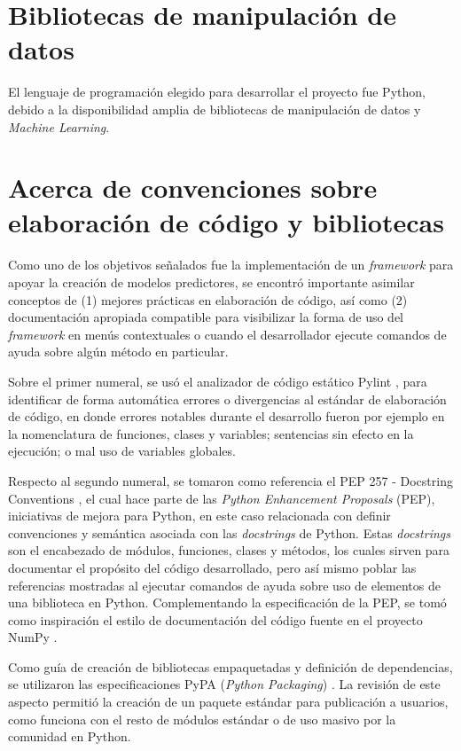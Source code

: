 \section{Bibliotecas de manipulación de datos}

El lenguaje de programación elegido para desarrollar el proyecto fue Python, debido a la disponibilidad amplia de bibliotecas de manipulación de datos y \textit{Machine Learning}.

\section{Acerca de convenciones sobre elaboración de código y bibliotecas}

Como uno de los objetivos señalados fue la implementación de un \textit{framework} para apoyar la creación de modelos predictores, se encontró importante asimilar conceptos de (1) mejores prácticas en elaboración de código, así como (2) documentación apropiada compatible para visibilizar la forma de uso del \textit{framework} en menús contextuales o cuando el desarrollador ejecute comandos de ayuda sobre algún método en particular.

Sobre el primer numeral, se usó el analizador de código estático Pylint \cite{pylint}, para identificar de forma automática errores o divergencias al estándar de elaboración de código, en donde errores notables durante el desarrollo fueron por ejemplo en la nomenclatura de funciones, clases y variables; sentencias sin efecto en la ejecución; o mal uso de variables globales.

Respecto al segundo numeral, se tomaron como referencia el PEP 257 - Docstring Conventions \cite{pep257}, el cual hace parte de las \textit{Python Enhancement Proposals} (PEP), iniciativas de mejora para Python, en este caso relacionada con definir convenciones y semántica asociada con las \textit{docstrings} de Python. Estas \textit{docstrings} son el encabezado de módulos, funciones, clases y métodos, los cuales sirven para documentar el propósito del código desarrollado, pero así mismo poblar las referencias mostradas al ejecutar comandos de ayuda sobre uso de elementos de una biblioteca en Python. Complementando la especificación de la PEP, se tomó como inspiración el estilo de documentación del código fuente en el proyecto NumPy \cite{numpy}.

Como guía de creación de bibliotecas empaquetadas y definición de dependencias, se utilizaron las especificaciones PyPA (\textit{Python Packaging}) \cite{pypa}. La revisión de este aspecto permitió la creación de un paquete estándar para publicación a usuarios, como funciona con el resto de módulos estándar o de uso masivo por la comunidad en Python.